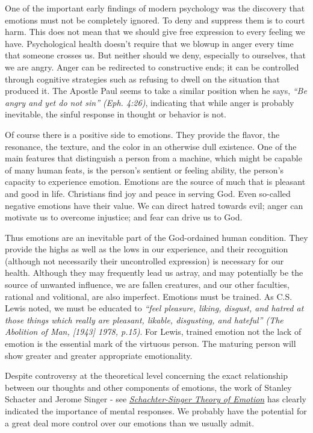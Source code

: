 \documentclass[
]{book}
\begin{document}
One of the important early findings of modern psychology was the discovery that emotions must not be completely ignored. To deny and suppress them is to court harm. This does not mean that we should give free expression to every feeling we have. Psychological health doesn't require that we blowup in anger every time that someone crosses us. But neither should we deny, especially to ourselves, that we are angry. Anger can be redirected to constructive ends; it can be controlled through cognitive strategies such as refusing to dwell on the situation that produced it. The Apostle Paul seems to take a similar position when he says, \emph{``Be angry and yet do not sin'' (Eph. 4:26)}, indicating that while anger is probably inevitable, the sinful response in thought or behavior is not.

Of course there is a positive side to emotions. They provide the flavor, the resonance, the texture, and the color in an otherwise dull existence. One of the main features that distinguish a person from a machine, which might be capable of many human feats, is the person's sentient or feeling ability, the person's capacity to experience emotion. Emotions are the source of much that is pleasant and good in life. Christians find joy and peace in serving God. Even so-called negative emotions have their value. We can direct hatred towards evil; anger can motivate us to overcome injustice; and fear can drive us to God.

Thus emotions are an inevitable part of the God-ordained human condition. They provide the highs as well as the lows in our experience, and their recognition (although not necessarily their uncontrolled expression) is necessary for our health. Although they may frequently lead us astray, and may potentially be the source of unwanted influence, we are fallen creatures, and our other faculties, rational and volitional, are also imperfect. Emotions must be trained. As C.S. Lewis noted, we must be educated to \emph{``feel pleasure, liking, disgust, and hatred at those things which really are pleasant, likable, disgusting, and hateful'' (The Abolition of Man, {[}1943{]} 1978, p.15)}. For Lewis, trained emotion not the lack of emotion is the essential mark of the virtuous person. The maturing person will show greater and greater appropriate emotionality.

Despite controversy at the theoretical level concerning the exact relationship between our thoughts and other components of emotions, the work of Stanley Schacter and Jerome Singer - see \href{https://www.thoughtco.com/schachter-singer-theory-4691140}{\emph{Schachter-Singer Theory of Emotion}} has clearly indicated the importance of mental responses. We probably have the potential for a great deal more control over our emotions than we usually admit.
\end{document}
